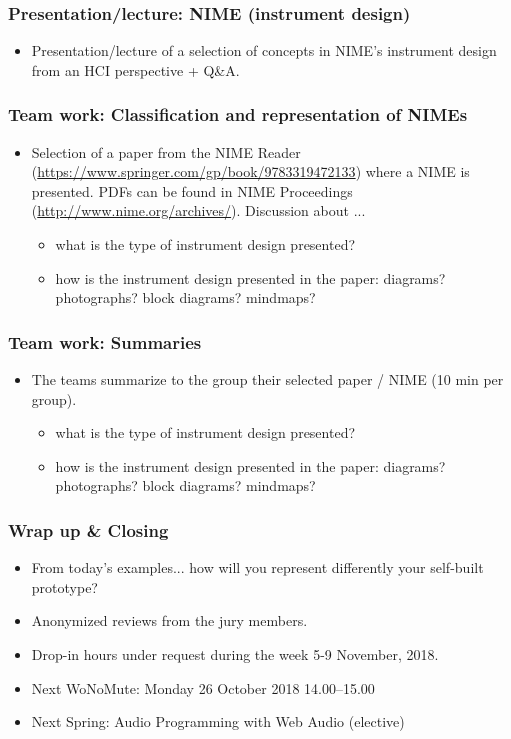 \documentclass[screen, aspectratio=43]{beamer}
\begin{document}
%
\begin{frame}
\frametitle{Presentation/lecture: NIME (instrument design)}
\begin{itemize}
\item Presentation/lecture of a selection of concepts in NIME's instrument design from an HCI perspective + Q\&A.
\end{itemize}
\end{frame}
%
\begin{frame}
\frametitle{Team work: Classification and representation of NIMEs}
\begin{itemize}
\item Selection of a paper from the NIME Reader (\url{https://www.springer.com/gp/book/9783319472133}) where a NIME is presented. PDFs can be found in NIME Proceedings (\url{http://www.nime.org/archives/}).
Discussion about ... 
\begin{itemize}
\item what is the type of instrument design presented?
\item how is the instrument design presented in the paper: diagrams? photographs? block diagrams?
 mindmaps?
\end{itemize}
\end{itemize}
\end{frame}
%
\begin{frame}
\frametitle{Team work: Summaries}
\begin{itemize}
\item The teams summarize to the group their selected paper / NIME (10 min per group). 
\begin{itemize}
\item what is the type of instrument design presented?
\item how is the instrument design presented in the paper: diagrams? photographs? block diagrams? mindmaps?
\end{itemize}
\end{itemize}
\end{frame}
%
\begin{frame}
\frametitle{Wrap up \& Closing}
\begin{itemize}
\item From today's examples... how will you represent differently your self-built prototype?
\item Anonymized reviews from the jury members.
\item Drop-in hours under request during the week 5-9 November, 2018.
\item Next WoNoMute: Monday 26 October 2018 14.00--15.00
\item Next Spring: Audio Programming with Web Audio (elective)
\end{itemize}
\end{frame}
%
\end{document}
